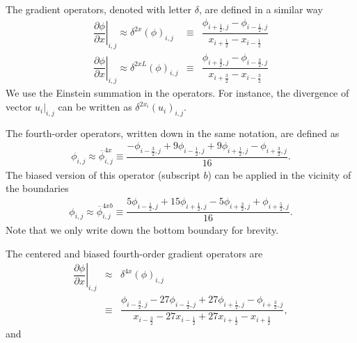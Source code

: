 \documentclass[gmd,manuscript]{copernicus}
\begin{document}
The gradient operators, denoted with letter $\delta$, are defined in a similar way
\begin{eqnarray}
\left. \dfrac{\partial \phi}{\partial x}\right|_{i,j} \approx \delta^{2x} \left( \phi \right)_{i,j} & \equiv & \dfrac{\phi_{i+\frac{1}{2},j} - \phi_{i-\frac{1}{2},j}}
                                                                                                                 {   x_{i+\frac{1}{2}}   -    x_{i-\frac{1}{2}  }} \\
\left. \dfrac{\partial \phi}{\partial x}\right|_{i,j} \approx \delta^{2xL} \left( \phi \right)_{i,j}& \equiv & \dfrac{\phi_{i+\frac{3}{2},j} - \phi_{i-\frac{3}{2},j}}
                                                                                                                  {   x_{i+\frac{3}{2}}   -    x_{i-\frac{3}{2}  }}
\end{eqnarray}
We use the Einstein summation in the operators. For instance, the divergence of vector $\left.u_i\right|_{i,j}$ can be written as $\delta^{2x_i}\left( u_i \right)_{i,j}$.
% 

The fourth-order operators, written down in the same notation, are defined as
\begin{eqnarray}
\phi_{i,j} \approx \overline{\phi}^{4x}_{i,j} \equiv \dfrac{- \phi_{i-\frac{3}{2},j} + 9 \phi_{i-\frac{1}{2},j} + 9 \phi_{i+\frac{1}{2},j} - \phi_{i+\frac{3}{2},j}}{16}.\label{eq:interp4}
\end{eqnarray}
The biased version of this operator (subscript $b$) can be applied in the vicinity of the boundaries 
\begin{eqnarray}
\phi_{i,j} \approx \overline{\phi}^{4xb}_{i,j} \equiv \dfrac{ 5 \phi_{i-\frac{1}{2},j} + 15 \phi_{i+\frac{1}{2},j} - 5 \phi_{i+\frac{3}{2},j} + \phi_{i+\frac{5}{2},j}}{16}.
\end{eqnarray}
Note that we only write down the bottom boundary for brevity.

The centered and biased fourth-order gradient operators are
\begin{eqnarray}
\nonumber
\left. \dfrac{\partial \phi}{\partial x}\right|_{i,j} & \approx & \delta^{4x} \left( \phi \right)_{i,j}\\
& \equiv & \dfrac{\phi_{i-\frac{3}{2},j} - 27 \phi_{i-\frac{1}{2},j} + 27 \phi_{i+\frac{1}{2},j} - \phi_{i+\frac{3}{2},j}}
             {       x_{i-\frac{3}{2}}   - 27    x_{i-\frac{1}{2}}   + 27    x_{i+\frac{1}{2}}   -    x_{i+\frac{3}{2}}},
\end{eqnarray}
and
\end{document}
